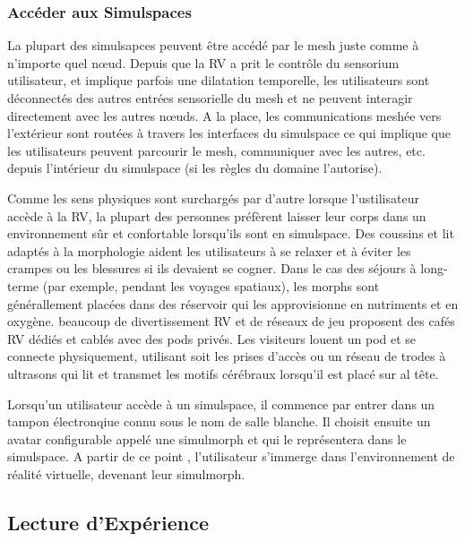 \subsubsection{Accéder aux Simulspaces} 

La plupart des simulsapces peuvent être accédé par le mesh juste comme à n'importe quel nœud. Depuis que la RV a prit le contrôle du sensorium utilisateur, et implique parfois une dilatation temporelle, les utilisateurs sont déconnectés des autres entrées sensorielle du mesh et ne peuvent interagir directement avec les autres nœuds. A la place, les communications meshée vers l'extérieur sont routées à travers les interfaces du simulspace ce qui implique que les utilisateurs peuvent parcourir le mesh, communiquer avec les autres, etc. depuis l'intérieur du simulspace (si les règles du domaine l'autorise). 

Comme les sens physiques sont surchargés par d'autre lorsque l'ustilisateur accède à la RV, la plupart des personnes préfèrent laisser leur corps dans un environnement sûr et confortable lorsqu'ils sont en simulspace. Des coussins et lit adaptés à la morphologie aident les utilisateurs à se relaxer et à éviter les crampes ou les blessures si ils devaient se cogner. Dans le cas des séjours à long-terme (par exemple, pendant les voyages spatiaux), les morphs sont générallement placées dans des réservoir qui les approvisionne en nutriments et en oxygène. beaucoup de divertissement RV et de réseaux de jeu proposent des cafés RV dédiés et cablés avec des pods privés. Les visiteurs louent un pod et se connecte physiquement, utilisant soit les prises d'accès ou un réseau de trodes à ultrasons qui lit et transmet les motifs cérébraux lorsqu'il est placé sur al tête. 

Lorsqu'un utilisateur accède à un simulspace, il commence par entrer dans un tampon électronqiue connu sous le nom de salle blanche. Il choisit ensuite un avatar configurable appelé une simulmorph et qui le représentera dans le simulspace. A partir de ce point , l'utilisateur s'immerge dans l'environnement de réalité virtuelle, devenant leur simulmorph. 

\subsection{Lecture d'Expérience} 

